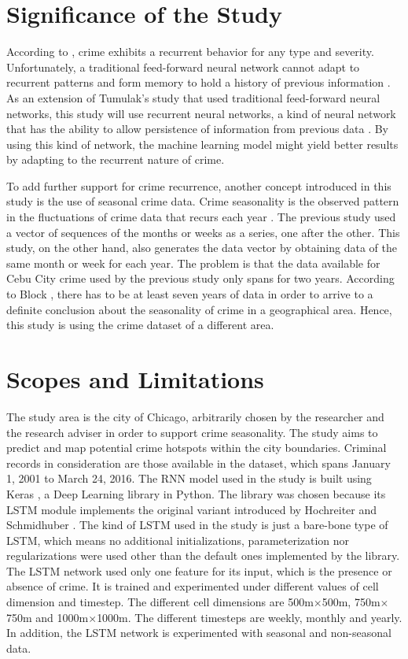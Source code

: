 \section{Significance of the Study}

    According to \citet{perc2013understanding}, crime exhibits a recurrent behavior for any type and severity. Unfortunately, a traditional feed-forward neural network cannot adapt to recurrent patterns and form memory to hold a history of previous information \citep{mikolov2010recurrent}. As an extension of Tumulak's study \citeyearpar{tumulak2015crime} that used traditional feed-forward neural networks, this study will use recurrent neural networks, a kind of neural network that has the ability to allow persistence of information from previous data \citep{graves2012supervised}. By using this kind of network, the machine learning model might yield better results by adapting to the recurrent nature of crime.

    To add further support for crime recurrence, another concept introduced in this study is the use of seasonal crime data. Crime seasonality is the observed pattern in the fluctuations of crime data that recurs each year \citep{lauritsen2014seasonal}. The previous study used a vector of sequences of the months or weeks as a series, one after the other. This study, on the other hand, also generates the data vector by obtaining data of the same month or week for each year. The problem is that the data available for Cebu City crime used by the previous study only spans for two years. According to Block \citeyearpar{block1984crime}, there has to be at least seven years of data in order to arrive to a definite conclusion about the seasonality of crime in a geographical area. Hence, this study is using the crime dataset of a different area.

\section{Scopes and Limitations}

    The study area is the city of Chicago, arbitrarily chosen by the researcher and the research adviser in order to support crime seasonality. The study aims to predict and map potential crime hotspots within the city boundaries. Criminal records in consideration are those available in the dataset, which spans January 1, 2001 to March 24, 2016. The RNN model used in the study is built using Keras \citeyearpar{chollet2015keras}, a Deep Learning library in Python. The library was chosen because its LSTM module implements the original variant introduced by Hochreiter and Schmidhuber \citeyearpar{hochreiter1997long}. The kind of LSTM used in the study is just a bare-bone type of LSTM, which means no additional initializations, parameterization nor regularizations were used other than the default ones implemented by the library. The LSTM network used only one feature for its input, which is the presence or absence of crime. It is trained and experimented under different values of cell dimension and timestep. The different cell dimensions are 500m\(\times\)500m, 750m\(\times\)750m and 1000m\(\times\)1000m. The different timesteps are weekly, monthly and yearly. In addition, the LSTM network is experimented with seasonal and non-seasonal data.